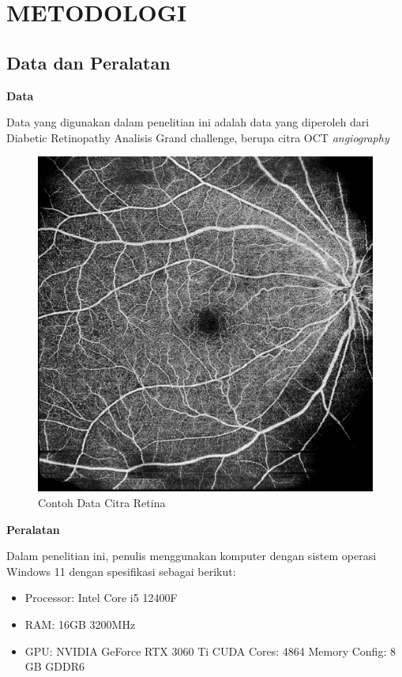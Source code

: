 \chapter{METODOLOGI}


\section{Data dan Peralatan}

\textbf{Data}

Data yang digunakan dalam penelitian ini adalah data yang diperoleh dari Diabetic Retinopathy Analisis Grand challenge, berupa citra OCT \emph{angiography}

\begin{figure} [H] \centering
  \includegraphics[scale=0.2]{gambar/exampleimage.png}
  \caption{Contoh Data Citra Retina}
  \label{fig:citraRetina}
\end{figure}

\textbf{Peralatan}

Dalam penelitian ini, penulis menggunakan komputer dengan sistem operasi Windows 11 dengan spesifikasi sebagai berikut:
\begin{itemize}
  \item Processor: Intel Core i5 12400F
  \item RAM: 16GB 3200MHz
  \item GPU: NVIDIA GeForce RTX 3060 Ti
  \subitem CUDA Cores: 4864
  \subitem Memory Config: 8 GB GDDR6
\end{itemize}

